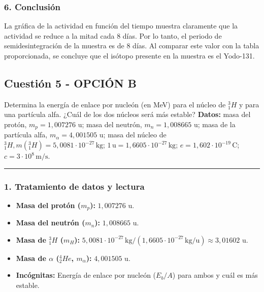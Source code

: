 \subsubsection*{6. Conclusión}
\begin{cajaconclusion}
La gráfica de la actividad en función del tiempo muestra claramente que la actividad se reduce a la mitad cada 8 días. Por lo tanto, el periodo de semidesintegración de la muestra es de 8 días. Al comparar este valor con la tabla proporcionada, se concluye que el isótopo presente en la muestra es el Yodo-131.
\end{cajaconclusion}

\newpage

\subsection{Cuestión 5 - OPCIÓN B}
\label{subsec:5B_2015_jul_ext}

\begin{cajaenunciado}
Determina la energía de enlace por nucleón (en MeV) para el núcleo de ${}_{1}^{3}H$ y para una partícula alfa. ¿Cuál de los dos núcleos será más estable?
\textbf{Datos:} masa del protón, $m_{p}=1,007276$ u; masa del neutrón, $m_{n}=1,008665$ u; masa de la partícula alfa, $m_{\alpha} = 4,001505$ u; masa del núcleo de ${}_{1}^{3}H, m({}_{1}^{3}H)=5,0081\cdot10^{-27}\,\text{kg}$; $1\,\text{u}=1,6605\cdot10^{-27}\,\text{kg}$; $e=1,602\cdot10^{-19}\,\text{C}$; $c=3\cdot10^{8}\,\text{m/s}$.
\end{cajaenunciado}
\hrule

\subsubsection*{1. Tratamiento de datos y lectura}
\begin{itemize}
    \item \textbf{Masa del protón ($m_p$):} $1,007276$ u.
    \item \textbf{Masa del neutrón ($m_n$):} $1,008665$ u.
    \item \textbf{Masa de ${}_{1}^{3}H$ ($m_H$):} $5,0081\cdot10^{-27}\,\text{kg} / (1,6605\cdot10^{-27}\,\text{kg/u}) \approx 3,01602$ u.
    \item \textbf{Masa de $\alpha$ (${}_{2}^{4}He$, $m_\alpha$):} $4,001505$ u.
    \item \textbf{Incógnitas:} Energía de enlace por nucleón ($E_b/A$) para ambos y cuál es más estable.
\end{itemize}


